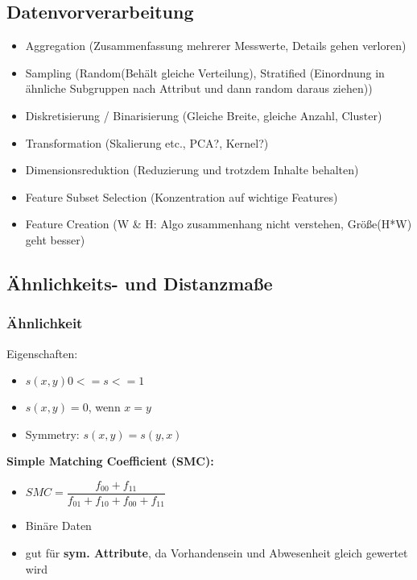 \documentclass[a4paper]{article}
\begin{document}
\begin{landscape}
\begin{multicols}{3}
    \subsection{Datenvorverarbeitung}

    \begin{itemize}[noitemsep,nolistsep]
        \item Aggregation (Zusammenfassung mehrerer Messwerte, Details gehen verloren)
        \item Sampling (Random(Behält gleiche Verteilung), Stratified (Einordnung in ähnliche Subgruppen nach Attribut und dann random daraus ziehen))
        \item Diskretisierung / Binarisierung (Gleiche Breite, gleiche Anzahl, Cluster)
        \item Transformation (Skalierung etc., PCA?, Kernel?)
        \item Dimensionsreduktion (Reduzierung und trotzdem Inhalte behalten)
        \item Feature Subset Selection (Konzentration auf wichtige Features)
        \item Feature Creation (W \& H: Algo zusammenhang nicht verstehen, Größe(H*W) geht besser)
    \end{itemize}

    \subsection{Ähnlichkeits- und Distanzmaße}
            \subsubsection{Ähnlichkeit}

            Eigenschaften:
            \begin{itemize}[noitemsep,nolistsep]
                \item $s(x,y) 0 <= s <= 1$
                \item $s(x,y) = 0$, wenn $x = y$
                \item Symmetry: $s(x,y) = s(y,x)$
            \end{itemize}

            \textbf{Simple Matching Coefficient (SMC):}
            \begin{itemize}[noitemsep,nolistsep]
                \item $ SMC = \dfrac{f_{00}+f_{11}}{f_{01}+ f_{10}+ f_{00}+ f_{11}} $
                \item Binäre Daten
                \item gut für \textbf{sym. Attribute}, da Vorhandensein und Abwesenheit gleich gewertet wird
            \end{itemize}


\end{multicols}
\end{landscape}
\end{document}
